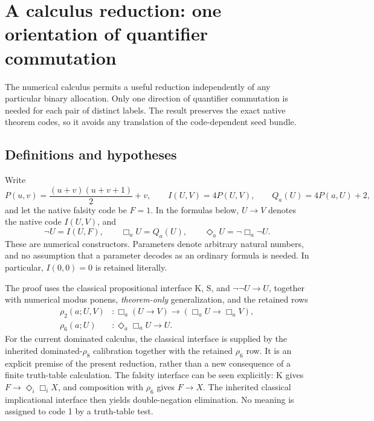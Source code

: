 \section{A calculus reduction: one orientation of quantifier commutation}
\label{sec:ordered-commutation}

The numerical calculus permits a useful reduction independently of any
particular binary allocation.  Only one direction of quantifier
commutation is needed for each pair of distinct labels.  The result
preserves the exact native theorem codes, so it avoids any translation
of the code-dependent seed bundle.

\subsection{Definitions and hypotheses}

Write
\[
 P(u,v)=\frac{(u+v)(u+v+1)}2+v,\qquad
 I(U,V)=4P(U,V),\qquad Q_a(U)=4P(a,U)+2,
\]
and let the native falsity code be $F=1$.  In the formulas below,
$U\to V$ denotes the native code $I(U,V)$, and
\[
 \neg U=I(U,F),\qquad
 \Box_a U=Q_a(U),\qquad
 \Diamond_a U=\neg\Box_a\neg U.
\]
These are numerical constructors.  Parameters denote arbitrary natural
numbers, and no assumption that a parameter decodes as an ordinary
formula is needed.  In particular, $I(0,0)=0$ is retained literally.

The proof uses the classical propositional interface K, S, and
$\neg\neg U\to U$, together with numerical modus ponens,
\emph{theorem-only} generalization, and the retained rows
\begin{align}
 \rho_2(a;U,V)&:
 \Box_a(U\to V)\to(\Box_a U\to\Box_a V),
 \label{eq:ordered-normality}\\
 \rho_6(a;U)&:
 \Diamond_a\Box_a U\to U.
 \label{eq:ordered-counit}
\end{align}
For the current dominated calculus, the classical interface is supplied
by the inherited dominated-$\rho_8$ calibration together with the retained $\rho_6$ row.  It is an explicit premise
of the present reduction, rather than a new consequence of a finite
truth-table calculation. The falsity interface can be seen explicitly:
K gives $F\to\Diamond_i\Box_i X$, and composition with $\rho_6$
gives $F\to X$. The inherited classical implicational interface
then yields double-negation elimination. No meaning is assigned to
code 1 by a truth-table test.

